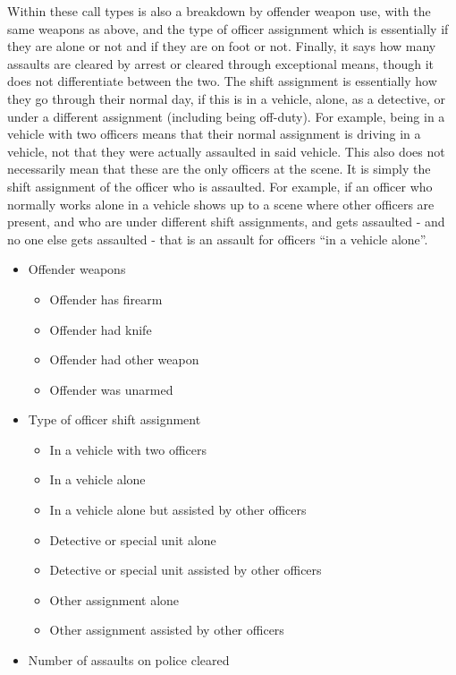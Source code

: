 \documentclass[
]{krantz}
\providecommand{\tightlist}{%
  \setlength{\itemsep}{0pt}\setlength{\parskip}{0pt}}
\begin{document}
Within these call types is also a breakdown by offender
weapon use, with the same weapons as above, and the type of
officer assignment which is essentially if they are alone or
not and if they are on foot or not. Finally, it says how
many assaults are cleared by arrest or cleared through
exceptional means, though it does not differentiate between
the two. The shift assignment is essentially how they go
through their normal day, if this is in a vehicle, alone, as
a detective, or under a different assignment (including
being off-duty). For example, being in a vehicle with two
officers means that their normal assignment is driving in a
vehicle, not that they were actually assaulted in said
vehicle. This also does not necessarily mean that these are
the only officers at the scene. It is simply the shift
assignment of the officer who is assaulted. For example, if
an officer who normally works alone in a vehicle shows up to
a scene where other officers are present, and who are under
different shift assignments, and gets assaulted - and no one
else gets assaulted - that is an assault for officers ``in a
vehicle alone''.

\begin{itemize}
\tightlist
\item
  Offender weapons

  \begin{itemize}
  \tightlist
  \item
    Offender has firearm
  \item
    Offender had knife
  \item
    Offender had other weapon
  \item
    Offender was unarmed
  \end{itemize}
\item
  Type of officer shift assignment

  \begin{itemize}
  \tightlist
  \item
    In a vehicle with two officers
  \item
    In a vehicle alone
  \item
    In a vehicle alone but assisted by other officers
  \item
    Detective or special unit alone
  \item
    Detective or special unit assisted by other officers
  \item
    Other assignment alone
  \item
    Other assignment assisted by other officers
  \end{itemize}
\item
  Number of assaults on police cleared
\end{itemize}
\end{document}
